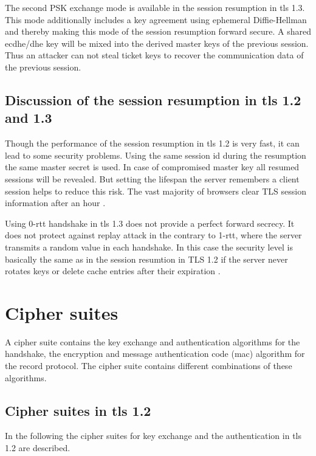 The second PSK exchange mode is available in the session resumption in \gls{tls} 1.3. This mode additionally includes a key agreement using ephemeral Diffie-Hellman and thereby making this mode of the session resumption forward secure. A shared \gls{ecdhe}/\gls{dhe} key will be mixed into the derived master keys of the previous session. Thus an attacker can not steal ticket keys to recover the communication data of the previous session. \cite{taubert} 

\subsection{Discussion of the session resumption in \gls{tls} 1.2 and 1.3}
\label{subsec:discussion_resumption}
Though the performance of the session resumption in \gls{tls} 1.2 is very fast, it can lead to some security problems. Using the same session id during the resumption the same master secret is used. In case of compromised master key all resumed sessions will be revealed.
But setting the lifespan the server remembers a client session helps to reduce this risk. The vast majority of browsers clear TLS session information after an hour \cite{zdnet}.

Using 0-\gls{rtt} handshake in \gls{tls} 1.3 does not provide a perfect forward secrecy. It does not protect against replay attack in the contrary to 1-\gls{rtt}, where the server transmits a random value in each handshake.
\cite{recorla}
In this case the security level is basically the same as in the session resumtion in TLS 1.2 if the server never rotates keys or delete cache entries after their expiration \cite{taubert}.

\section{Cipher suites}
\label{sec:comparison_ciphersuits}

A cipher suite contains the key exchange and authentication algorithms for the handshake, the encryption and message authentication code (\gls{mac}) algorithm for the record protocol. The cipher suite contains different combinations of these algorithms.

\subsection{Cipher suites in \gls{tls} 1.2}
\label{subsec:ciphersuits1_2}

In the following the cipher suites for key exchange and the authentication in \gls{tls} 1.2 are described.


